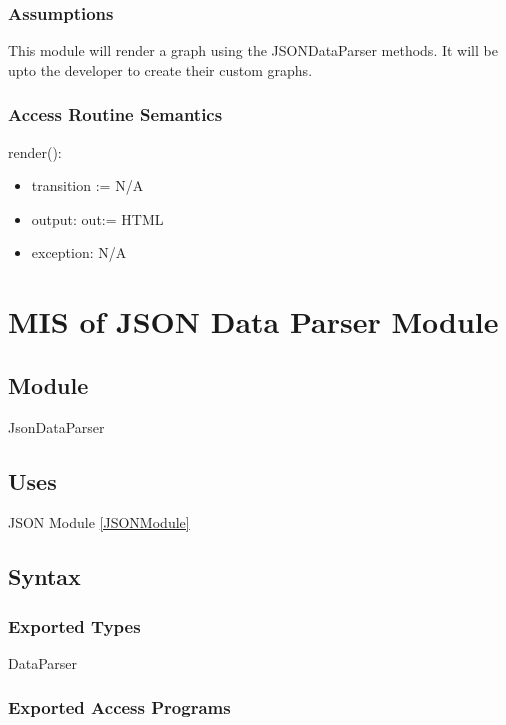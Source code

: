 \documentclass[12pt, titlepage]{article}
\begin{document}
\subsubsection{Assumptions}
This module will render a graph using the JSONDataParser methods. It will be upto the developer to create their custom graphs.

\subsubsection{Access Routine Semantics}

\noindent render():
\begin{itemize}
\item transition := N/A
\item output: out:= HTML
\item exception: N/A
\end{itemize}

\newpage
\section{MIS of JSON Data Parser Module} \label{DataParserModule} 
\subsection{Module}
JsonDataParser

\subsection{Uses}
JSON Module \ref{JSONModule}

\subsection{Syntax}

\subsubsection{Exported Types}
DataParser

\subsubsection{Exported Access Programs}
\end{document}
